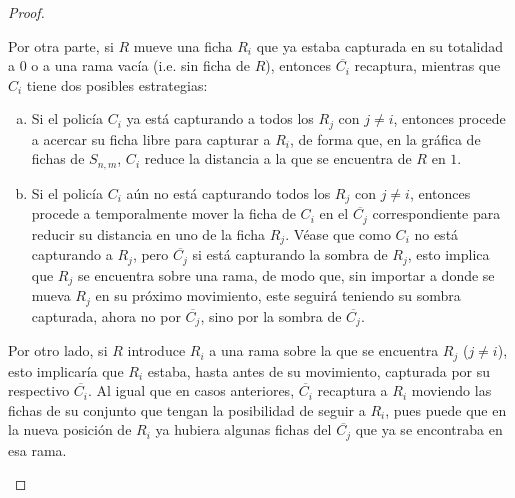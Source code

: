 \begin{proof}
\begin{enumerate}
            Por otra parte, si $R$ mueve una ficha $R_i$ que ya estaba capturada
            en su totalidad a $0$ o a una rama vac\'ia (i.e. sin ficha de $R$),
            entonces $\overline{C_i}$ recaptura, mientras que $C_i$ tiene dos
            posibles estrategias:
            \begin{enumerate}[(a)]
                \item Si el polic\'ia $C_i$ ya est\'a capturando a todos los $R_j$
                con $j\neq i$, entonces procede a acercar su ficha libre para
                capturar a $R_i$, de forma que, en la gr\'afica de fichas de
                $S_{n,m}$, $C_i$ reduce la distancia a la que se encuentra de
                $R$ en $1$.
                \item Si el polic\'ia $C_i$ a\'un no est\'a capturando todos los $R_j$
                con $j\neq i$, entonces procede a temporalmente mover la ficha
                de $C_i$ en el $\overline{C_j}$ correspondiente para reducir su
                distancia en uno de la ficha $R_j$. V\'ease que como $C_i$ no est\'a
                capturando a $R_j$, pero $\overline{C_j}$ si est\'a capturando la
                sombra de $R_j$, esto implica que $R_j$ se encuentra sobre una
                rama, de modo que, sin importar a donde se mueva $R_j$ en su
                pr\'oximo movimiento, este seguir\'a teniendo su sombra capturada,
                ahora no por $\overline{C_j}$, sino por la sombra de
                $\overline{C_j}$.
            \end{enumerate}
            
            Por otro lado, si $R$ introduce $R_i$ a una rama sobre la que se
            encuentra $R_j$ ($j\neq i$), esto implicar\'ia que $R_i$ estaba, hasta
            antes de su movimiento, capturada por su respectivo $\overline{C_i}$.
            Al igual que en casos anteriores, $\overline{C_i}$ recaptura a $R_i$
            moviendo las fichas de su conjunto que tengan la posibilidad de
            seguir a $R_i$, pues puede que en la nueva posici\'on de $R_i$ ya
            hubiera algunas fichas del $\overline{C_j}$ que ya se encontraba en
            esa rama. 
            

\end{enumerate}
\end{proof}
